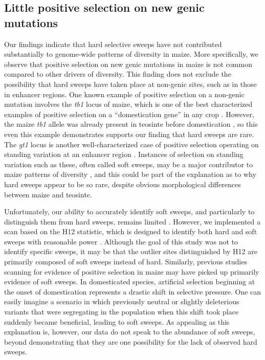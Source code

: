 \documentclass{pnastwo}
\begin{document}
\begin{article}
\subsection{Little positive selection on new genic mutations}
Our findings indicate that hard selective sweeps have not contributed substantially to genome-wide patterns of diversity in maize. More specifically, we observe that positive selection on new genic mutations in maize is not common compared to other drivers of diversity. This finding does not exclude the possibility that hard sweeps have taken place at non-genic sites, such as in those in enhancer regions. One known example of positive selection on a non-genic mutation involves the \emph{tb1} locus of maize, which is one of the best characterized examples of positive selection on a ``domestication gene'' in any crop \cite{clark2006}. However, the maize \emph{tb1} allele was already present in teosinte before domestication \cite{studer2011}, so this even this example demonstrates supports our finding that hard sweeps are rare. The \emph{gt1} locus is another well-characterized case of positive selection operating on standing variation at an enhancer region \cite{wills2013}. Instances of selection on standing variation such as these, often called soft sweeps, may be a major contributor to maize patterns of diversity \cite{beissinger2014}, and this could be part of the explanation as to why hard sweeps appear to be so rare, despite obvious morphological differences between maize and teosinte.

Unfortunately, our ability to accurately identify soft sweeps, and particularly to distinguish them from hard sweeps, remains limited \cite{innan2004,messer2013}. However, we implemented a scan based on the H12 statistic, which is designed to identify both hard and soft sweeps with reasonable power \cite{garud2015}. Although the goal of this study was not to identify specific sweeps, it may be that the outlier sites distinguished by H12 are primarily composed of soft sweeps instead of hard. Similarly, previous studies scanning for evidence of positive selection in maize \cite{hufford2012} may have picked up primarily evidence of soft sweeps. In domesticated species, artificial selection beginning at the onset of domestication represents a drastic shift in selective pressure. One can easily imagine a scenario in which previously neutral or slightly deleterious variants that were segregating in the population when this shift took place suddenly became beneficial, leading to soft sweeps. As appealing as this explanation is, however, our data do not speak to the abundance of soft sweeps, beyond demonstrating that they are one possibility for the lack of observed hard sweeps.


\end{article}
\end{document}
